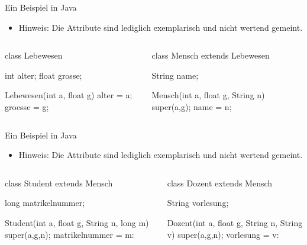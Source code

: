 \begin{frame}[fragile]{Ein Beispiel in Java}
    \begin{itemize}[<+(1)->]
        \item Hinweis: Die Attribute sind lediglich exemplarisch und nicht wertend gemeint.
    \end{itemize}
    \pause{}\begin{center}
        \scriptsize%
        \begin{columns}
            \begin{column}{.42\textwidth}
\begin{plainjava}
class Lebewesen {
    int alter;
    float grosse;

    Lebewesen(int a, float g) {
        alter = a;
        groesse = g;
    }
}
\end{plainjava}
            \end{column}\pause{}
            \begin{column}{.5\textwidth}
\begin{plainjava}
class Mensch extends Lebewesen {
    String name;

    Mensch(int a, float g, String n) {
        super(a,g);
        name = n;
    }
}
\end{plainjava}
            \end{column}
        \end{columns}
    \end{center}
\end{frame}

\begin{frame}[fragile]{Ein Beispiel in Java}
    \begin{itemize}[<+(1)->]
        \item<1-> Hinweis: Die Attribute sind lediglich exemplarisch und nicht wertend gemeint.
    \end{itemize}
    \pause{}\begin{center}
        \scriptsize%
        \begin{columns}
            \begin{column}{.49\textwidth}
\begin{plainjava}
class Student extends Mensch {
    long matrikelnummer;

    Student(int a, float g, String n,
            long m) {
        super(a,g,n);
        matrikelnummer = m:
    }
}
\end{plainjava}
            \end{column}\pause{}
            \begin{column}{.49\textwidth}
\begin{plainjava}
class Dozent extends Mensch {
    String vorlesung;

    Dozent(int a, float g, String n,
           String v) {
        super(a,g,n);
        vorlesung = v:
    }
}
\end{plainjava}
            \end{column}
        \end{columns}
    \end{center}
\end{frame}

